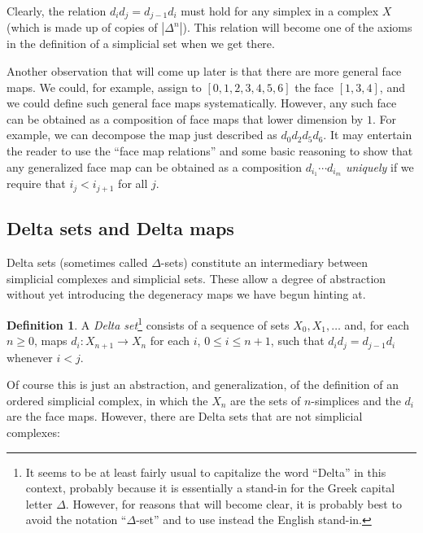\documentclass[12pt]{article}
\theoremstyle{plain}
\theoremstyle{definition}
\newtheorem{definition}[theorem]{Definition}
\theoremstyle{remark}
\begin{document}
Clearly, the relation $d_id_j=d_{j-1}d_i$ must hold for any simplex in a complex $X$ (which is made up of copies of $|\Delta^n|$). This relation  will become one of the axioms in the definition of a simplicial set when we get there.


Another observation that will come up later is that there are more general face maps. We could, for example, assign to $[0,1,2,3,4,5,6]$ the face $[1,3,4]$, and we could define such general face maps systematically. However, any such face can be obtained as a composition of face maps that lower dimension by $1$. For example, we can decompose the map just described as $d_0d_2d_5d_6$. It may entertain the reader to use the ``face map relations'' and some basic reasoning to show that any generalized face map can be obtained as a composition $d_{i_1}\cdots d_{i_m}$ \emph{uniquely} if we require that $i_j<i_{j+1}$ for all $j$.












\subsection{Delta sets and Delta maps}


Delta sets (sometimes called $\Delta$-sets) constitute an intermediary between simplicial complexes and simplicial sets. These allow a degree of abstraction without yet introducing the degeneracy maps we have begun hinting at.

\begin{definition}
A \emph{Delta set}\footnote{It seems to be at least fairly usual to capitalize the word ``Delta'' in this context, probably because it is essentially a stand-in for the Greek capital letter $\Delta$. However, for reasons that will become clear, it is probably best to avoid the notation ``$\Delta$-set'' and to use instead the English stand-in.} consists of a sequence of  sets $X_0, X_1, \ldots$ and, for each $n\geq 0$, maps $d_i\colon X_{n+1}\to X_n$ for each $i$, $0\leq i\leq n+1$, such that $d_id_j=d_{j-1}d_i$ whenever $i<j$.
\end{definition}

Of course this is just an abstraction, and generalization, of the definition of an ordered simplicial complex, in which the $X_n$ are the sets of $n$-simplices and the $d_i$ are the face maps. However, there are Delta sets that are not simplicial complexes:
\end{document}
